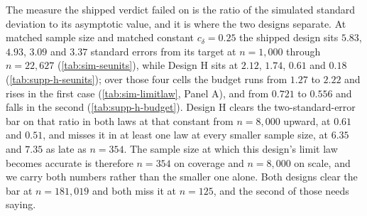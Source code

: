 \documentclass[
  12pt]{article}
\newcommand{\1}[1]{\mathds{1}\left[#1\right]}
\theoremstyle{plain}
\theoremstyle{definition}
\theoremstyle{definition}
\theoremstyle{remark}
\begin{document}
The measure the shipped verdict failed on is the ratio of the simulated standard
deviation to its asymptotic value, and it is where the two designs separate. At
matched sample size and matched constant $c_\delta=0.25$ the
shipped design sits $5.83$, $4.93$, $3.09$ and $3.37$ standard errors from its
target at $n=1{,}000$ through $n=22{,}627$ (\cref{tab:sim-seunits}), while Design
H sits at $2.12$,
$1.74$, $0.61$ and $0.18$ (\cref{tab:supp-h-seunits}); over those four cells
the budget runs from $1.27$ to
$2.22$ and rises in the first case (\cref{tab:sim-limitlaw}, Panel A), and from
$0.721$ to $0.556$ and falls in the
second (\cref{tab:supp-h-budget}). Design H clears the two-standard-error bar on that ratio in both laws at
that constant from $n=8{,}000$ upward, at $0.61$ and $0.51$, and misses it in at
least one law at every smaller sample size, at $6.35$ and $7.35$ as late as
$n=354$. The sample size at which this design's limit law becomes accurate is
therefore $n=354$ on coverage and $n=8{,}000$ on scale, and we carry both
numbers rather than the smaller one alone. Both designs clear the bar at
$n=181{,}019$ and both miss it at $n=125$, and the second of those needs saying.

% 
% 
% 
\end{document}

